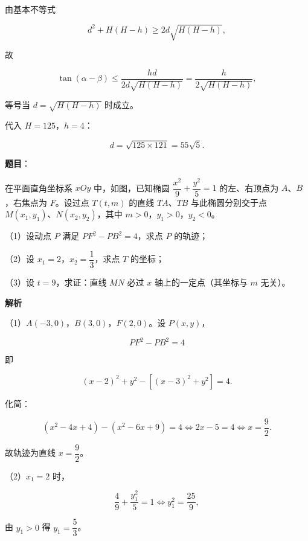 \begin{answer}
由基本不等式

\nopagebreak[4]
\[d^2+H(H-h)\geqslant2d\sqrt{H(H-h)},\]

故

\nopagebreak[4]
\[\tan(\alpha-\beta)\leqslant\frac{hd}{2d\sqrt{H(H-h)}}
=\frac h{2\sqrt{H(H-h)}},\]

等号当 $d=\sqrt{H(H-h)}$ 时成立。

代入 $H=125$，$h=4$：

\nopagebreak[4]
\[d=\sqrt{125\times121}=55\sqrt5.\]


\end{answer}
\begin{answer}

\textbf{题目}：

在平面直角坐标系 $xOy$ 中，如图，已知椭圆 $\dfrac{x^2}{9}+\dfrac{y^2}{5}=1$ 的左、右顶点为 $A$、$B$，右焦点为 $F$。设过点 $T(t,m)$ 的直线 $TA$、$TB$ 与此椭圆分别交于点 $M(x_1,y_1)$、$N(x_2,y_2)$，其中 $m>0$，$y_1>0$，$y_2<0$。

（1）设动点 $P$ 满足 $PF^2-PB^2=4$，求点 $P$ 的轨迹；

（2）设 $x_1=2$，$x_2=\dfrac13$，求点 $T$ 的坐标；

（3）设 $t=9$，求证：直线 $MN$ 必过 $x$ 轴上的一定点（其坐标与 $m$ 无关）。
\nopagebreak[4]
\begin{center}\end{center}
\nopagebreak[4]
\textbf{解析}

（1）$A(-3,0)$，$B(3,0)$，$F(2,0)$。设 $P(x,y)$，

\nopagebreak[4]
\[PF^2-PB^2=4\]

即

\nopagebreak[4]
\[(x-2)^2+y^2-\left[(x-3)^2+y^2\right]=4.\]

化简：

\nopagebreak[4]
\[(x^2-4x+4)-(x^2-6x+9)=4
\iff 2x-5=4
\iff x=\frac92.\]

故轨迹为直线 $x=\dfrac92$。

（2）$x_1=2$ 时，

\nopagebreak[4]
\[\frac49+\frac{y_1^2}5=1\iff y_1^2=\frac{25}9,\]

由 $y_1>0$ 得 $y_1=\dfrac53$。


\end{answer}
